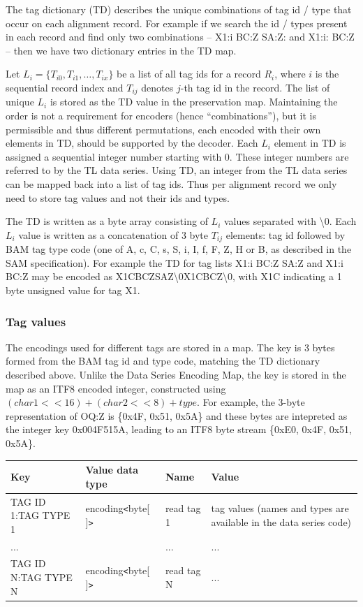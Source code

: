 \documentclass[a4paper]{article}
\begin{document}
The tag dictionary (TD) describes the unique combinations of tag id / type that occur on each alignment record.
For example if we search the id / types present in each record and find only two combinations -- X1:i BC:Z SA:Z: and X1:i: BC:Z -- then we have two dictionary entries in the TD map.

Let $L_{i}=\{T_{i0}, T_{i1}, \ldots, T_{ix}\}$ be a list of all tag ids for a record $R_{i}$, where $i$ is the sequential record index and $T_{ij}$ denotes $j$-th tag id in the record.
The list of unique $L_{i}$ is stored as the TD value in the preservation map.
Maintaining the order is not a requirement for encoders (hence ``combinations''), but it is permissible and thus different permutations, each encoded with their own elements in TD, should be supported by the decoder.
Each $L_{i}$ element in TD is assigned a sequential integer number starting with 0.
These integer numbers are referred to by the TL data series.
Using TD, an integer from the TL data series can be mapped back into a list of tag ids.
Thus per alignment record we only need to store tag values and not their ids and types.

The TD is written as a byte array consisting of $L_{i}$ values separated with \textbackslash{}0.
Each $L_{i}$ value is written as a concatenation of 3 byte $T_{ij}$ elements: tag id followed by BAM tag type code (one of A, c, C, s, S, i, I, f, F, Z, H or B, as described in the SAM specification).
For example the TD for tag lists X1:i BC:Z SA:Z and X1:i BC:Z may be encoded as X1CBCZSAZ\textbackslash{}0X1CBCZ\textbackslash{}0, with X1C indicating a 1 byte unsigned value for tag X1.

\subsubsection*{Tag values}

The encodings used for different tags are stored in a map.
The key is 3 bytes formed from the BAM tag id and type code, matching the TD dictionary described above.
Unlike the Data Series Encoding Map, the key is stored in the map as an ITF8 encoded integer, constructed using $(char1<<16) + (char2<<8) + type$.
For example, the 3-byte representation of OQ:Z is \{0x4F, 0x51, 0x5A\} and these bytes are intepreted as the integer key 0x004F515A, leading to an ITF8 byte stream \{0xE0, 0x4F, 0x51, 0x5A\}.

\begin{tabular}{|l|l|l|>{\raggedright}p{160pt}|}
\hline
\textbf{Key} & \textbf{Value data type} & \textbf{Name} & \textbf{Value}
\tabularnewline
\hline
TAG ID 1:TAG TYPE 1 & encoding\texttt{<}byte[ ]\texttt{>} & read tag 1 & tag values
(names and types are available in the data series code)\tabularnewline
\hline
... &  & ... & ...\tabularnewline
\hline
TAG ID N:TAG TYPE N & encoding\texttt{<}byte[ ]\texttt{>} & read tag N & ...\tabularnewline
\hline
\end{tabular}
\end{document}
